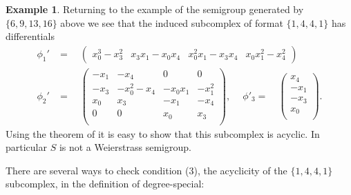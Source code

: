 \documentclass[twoside,12pt, leqno]{amsart}
\theoremstyle{definition}
\newtheorem{example}[theorem]{Example}
\begin{document}
\begin{example}\label{good 4x4}
Returning to the example of the semigroup generated by $\{6,9,13,16\}$ above we see that the
induced subcomplex of format $\{1,4,4,1\}$ has differentials
$$
\begin{aligned}
\phi_{1}' &= \quad
\begin{pmatrix}
 x_0^3-x_3^2 &x_3x_1-x_0x_4 &x_0^2x_1-x_3x_4 &x_0x_1^2-x_4^2 
 \end{pmatrix}
\\
 \phi_{2}' &= \quad
\begin{pmatrix}
-x_1 &-x_4  & 0  &  0    \\   
-x_3 &-x_0^2 -x_4& -x_0x_1 &-x_1^2 \\
x_0  &x_3   & -x_1 &-x_4 \\
0   & 0   &   x_0 & x_3 \\   
\end{pmatrix},\ 
\quad
\phi'_{3}= \quad
 \begin{pmatrix}
x_4   \\
-x_1 \\
 -x_3   \\
x_0  \\
\end{pmatrix}.
\end{aligned}
$$
Using the theorem of \cite{MR314819} it is easy to show that this subcomplex
is acyclic. In particular $S$ is not a Weierstrass semigroup.
\end{example}

There are several ways to check
condition (3), the acyclicity of the $\{1,4,4,1\}$ subcomplex, in the definition of degree-special:
\end{document}
